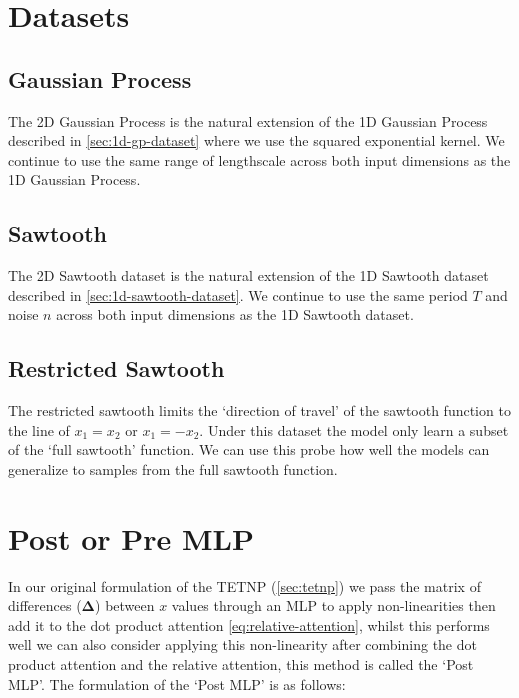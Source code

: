 \documentclass[../../main.tex]{subfiles}
\begin{document}
\section{Datasets}

\subsection{Gaussian Process}

The 2D Gaussian Process is the natural extension of the 1D Gaussian Process described in \autoref{sec:1d-gp-dataset} where we use the squared exponential kernel. We continue to use the same range of lengthscale across both input dimensions as the 1D Gaussian Process. 




\subsection{Sawtooth}

The 2D Sawtooth dataset is the natural extension of the 1D Sawtooth dataset described in \autoref{sec:1d-sawtooth-dataset}. We continue to use the same period $T$ and noise $n$ across both input dimensions as the 1D Sawtooth dataset.



\subsection{Restricted Sawtooth}

The restricted sawtooth limits the `direction of travel' of the sawtooth function to the line of $x_1 = x_2$ or $x_1 = -x_2$. Under this dataset the model only learn a subset of the `full sawtooth' function. We can use this probe how well the models can generalize to samples from the full sawtooth function.


\section{Post or Pre MLP}

In our original formulation of the TETNP (\autoref{sec:tetnp}) we pass the matrix of differences ($\bm{\Delta}$) between $x$ values through an MLP to apply non-linearities then add it to the dot product attention \autoref{eq:relative-attention}, whilst this performs well we can also consider applying this non-linearity after combining the dot product attention and the relative attention, this method is called the `Post MLP'. The formulation of the `Post MLP' is as follows:
\end{document}
